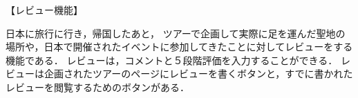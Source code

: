 【レビュー機能】
\par
日本に旅行に行き，帰国したあと，
ツアーで企画して実際に足を運んだ聖地の場所や，日本で開催されたイベントに参加してきたことに対してレビューをする機能である．
レビューは，コメントと５段階評価を入力することができる．
レビューは企画されたツアーのページにレビューを書くボタンと，すでに書かれたレビューを閲覧するためのボタンがある．
